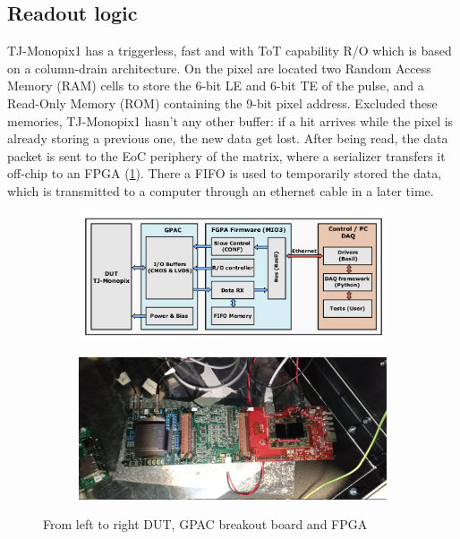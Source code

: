 \subsection{Readout logic}\label{chap:Monopix_RO}
    TJ-Monopix1 has a triggerless, fast and with ToT capability R/O which is based on a column-drain architecture.      
    On the pixel are located two Random Access Memory (RAM) cells to store the 6-bit LE and 6-bit TE of the pulse, and a Read-Only Memory (ROM) containing the 9-bit pixel address. Excluded these memories, TJ-Monopix1 hasn't any other buffer: if a hit arrives while the pixel is already storing a previous one, the new data get lost.  
    After being read, the data packet is sent to the EoC periphery of the matrix, where a serializer transfers it off-chip to an FPGA (\ref{fig:R/O-system}). There a FIFO is used to temporarily stored the data, which is transmitted to a computer through an ethernet cable in a later time.  
    \begin{figure}
        \begin{subfigure}{\textwidth}
        \centering
        \includegraphics[clip,width=0.8\linewidth]{figures/Monopix1/schematic_boards.png}
        \end{subfigure}
        \bigskip
        \begin{subfigure}{\textwidth}
        \centering    
        \includegraphics[clip,width=0.8\linewidth]{figures/Monopix1/monopix1_front.jpeg}
        \end{subfigure}
        \caption{From left to right DUT, GPAC breakout board and FPGA}
        \label{fig:R/O-system}
    \end{figure}


